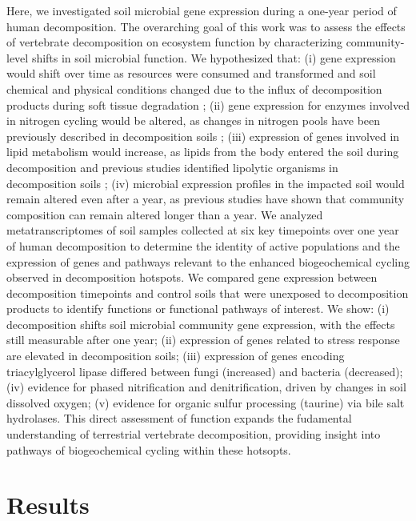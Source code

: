 \documentclass[
  sn-nature,
  lineno, referee]{sn-jnl}
\begin{document}
Here, we investigated soil microbial gene expression during a one-year
period of human decomposition. The overarching goal of this work was to
assess the effects of vertebrate decomposition on ecosystem function by
characterizing community-level shifts in soil microbial function. We
hypothesized that: (i) gene expression would shift over time as
resources were consumed and transformed and soil chemical and physical
conditions changed due to the influx of decomposition products during
soft tissue degradation
\citep{keenan_mortality_2018, fancher_evaluation_2017, debruyn_comparative_2021};
(ii) gene expression for enzymes involved in nitrogen cycling would be
altered, as changes in nitrogen pools have been previously described in
decomposition soils \citep{keenan_mortality_2018}; (iii) expression of
genes involved in lipid metabolism would increase, as lipids from the
body entered the soil during decomposition and previous studies
identified lipolytic organisms in decomposition soils
\citep{howard_characterization_2010, mason_body_2022}; (iv) microbial
expression profiles in the impacted soil would remain altered even after
a year, as previous studies have shown that community composition
\citep{cobaugh_functional_2015, singh_temporal_2018} can remain altered
longer than a year. We analyzed metatranscriptomes of soil samples
collected at six key timepoints over one year of human decomposition to
determine the identity of active populations and the expression of genes
and pathways relevant to the enhanced biogeochemical cycling observed in
decomposition hotspots. We compared gene expression between
decomposition timepoints and control soils that were unexposed to
decomposition products to identify functions or functional pathways of
interest. We show: (i) decomposition shifts soil microbial community
gene expression, with the effects still measurable after one year; (ii)
expression of genes related to stress response are elevated in
decomposition soils; (iii) expression of genes encoding triacylglycerol
lipase differed between fungi (increased) and bacteria (decreased); (iv)
evidence for phased nitrification and denitrification, driven by changes
in soil dissolved oxygen; (v) evidence for organic sulfur processing
(taurine) via bile salt hydrolases. This direct assessment of function
expands the fudamental understanding of terrestrial vertebrate
decomposition, providing insight into pathways of biogeochemical cycling
within these hotsopts.

\section{Results}\label{results}
\end{document}
